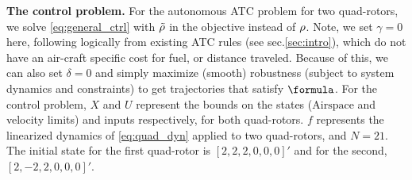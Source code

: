 \textbf{The control problem.} For the autonomous ATC problem for two quad-rotors, we solve \eqref{eq:general_ctrl}  with $\tilde{\rho}$ in the objective instead of $\rho$.
Note, we set $\gamma=0$ here, following logically from existing ATC rules (see sec.\ref{sec:intro}), which do not have an air-craft specific cost for fuel, or distance traveled. Because of this, we can also set $\delta=0$ and simply maximize (smooth) robustness (subject to system dynamics and constraints) to get trajectories that satisfy $\formula$.
For the control problem, $X$ and $U$ represent the bounds on the states ($\text{Airspace}$ and velocity limits) and inputs respectively, for both quad-rotors. $f$ represents the linearized dynamics of \eqref{eq:quad_dyn} applied to two quad-rotors, and $N=21$. The initial state for the first quad-rotor is $[2,2,2,0,0,0]'$ and for the second, $[2, -2 , 2 ,0 ,0 ,0]'$.

